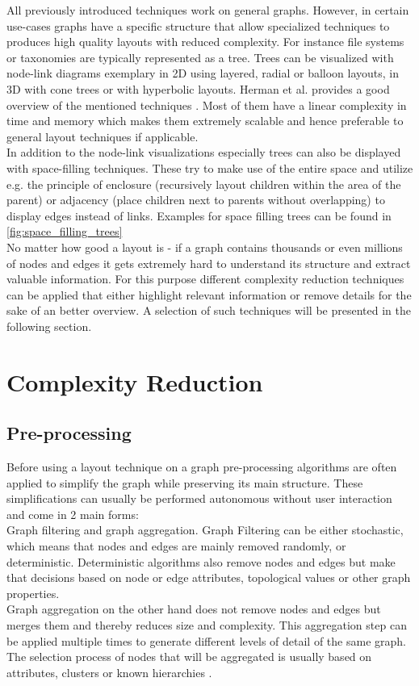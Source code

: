All previously introduced techniques work on general graphs. However, in certain use-cases graphs have a specific structure that allow specialized techniques to produces high quality layouts with reduced complexity. For instance file systems or taxonomies are typically represented as a tree. Trees can be visualized with node-link diagrams exemplary in 2D using layered, radial or balloon layouts, in 3D with cone trees or with hyperbolic layouts. Herman et al. provides a good overview of the mentioned techniques \cite{Herman2000}. Most of them have a linear complexity in time and memory which makes them extremely scalable and hence preferable to general layout techniques if applicable. \\
In addition to the node-link visualizations especially trees can also be displayed with space-filling techniques. These try to make use of the entire space and utilize e.g. the principle of enclosure (recursively layout children within the area of the parent) or adjacency (place children next to parents without overlapping) to display edges instead of links\cite{VonLandesberger2011}. Examples for space filling trees can be found in \autoref{fig:space_filling_trees}\\
No matter how good a layout is - if a graph contains thousands or even millions of nodes and edges it gets extremely hard to understand its structure and extract valuable information. For this purpose different complexity reduction techniques can be applied that either highlight relevant information or remove details for the sake of an better overview. A selection of such techniques will be presented in the following section.


\section{Complexity Reduction}

\subsection{Pre-processing}
Before using a layout technique on a graph pre-processing algorithms are often applied to simplify the graph while preserving its main structure. These simplifications can usually be performed autonomous without user interaction and come in 2 main forms:\\
Graph filtering and graph aggregation. Graph Filtering can be either stochastic, which means that nodes and edges are mainly removed randomly, or deterministic. Deterministic algorithms also remove nodes and edges but make that decisions based on node or edge attributes, topological values or other graph properties.\\
Graph aggregation on the other hand does not remove nodes and edges but merges them and thereby reduces size and complexity. This aggregation step can be applied multiple times to generate different levels of detail of the same graph. The selection process of nodes that will be aggregated is usually based on attributes, clusters or known hierarchies \cite{VonLandesberger2011}.

